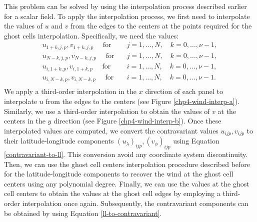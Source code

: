 This problem can be solved by using the interpolation process described earlier for a scalar field.
To apply the interpolation process, we first need to interpolate the values of $u$ and $v$ from the
edges to the centers at the points required for the ghost cells interpolation. Specifically, we need the values:
\begin{align*}
	u_{1+k,j,p}, v_{1+k,j,p} \quad \text{ for} \quad &j=1, \ldots, N, \quad k=0, \ldots, \nu-1,\\
	u_{N-k,j,p}, v_{N-k,j,p} \quad \text{ for} \quad &j=1, \ldots, N, \quad k=0, \ldots, \nu-1,\\
	u_{i,1+k,p}, v_{i,1+k,p} \quad \text{ for} \quad &i=1, \ldots, N, \quad k=0, \ldots, \nu-1,\\
    u_{i,N-k,p}, v_{i,N-k,p} \quad \text{ for} \quad &i=1, \ldots, N, \quad k=0, \ldots, \nu-1.\\
\end{align*}
We apply a third-order interpolation in the $x$ direction of each panel to interpolate $u$ from the edges to the centers
(see Figure \ref{chp4-wind-interp-a}). Similarly, we use a third-order interpolation to obtain the values of $v$ at the 
centers in the $y$ direction (see Figure \ref{chp4-wind-interp-b}).
Once these interpolated values are computed, we convert the contravariant values $u_{ijp}, v_{ijp}$
to their latitude-longitude components $(u_{\lambda})_{ijp}, (v_{\phi})_{ijp}$ using Equation
\eqref{contravariant-to-ll}. This conversion avoid any coordinate system discontinuity.
Then, we can use the ghost cell centers interpolation procedure described before for the latitude-longitude components
to recover the wind at the ghost cell centers using any polynomial degree.
Finally, we can use the values at the ghost cell centers to obtain the values at the ghost cell edges
by employing a third-order interpolation once again.
Subsequently, the contravariant components can be obtained by using Equation \eqref{ll-to-contravariant}.

